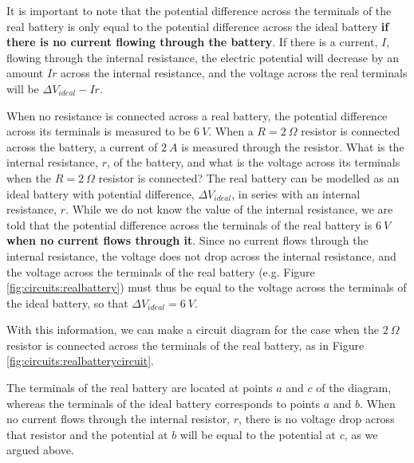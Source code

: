 It is important to note that the potential difference across the terminals of the real battery is only equal to the potential difference across the ideal battery \textbf{if there is no current flowing through the battery}. If there is a current, $I$, flowing through the internal resistance, the electric potential will decrease by an amount $Ir$ across the internal resistance, and the voltage across the real terminals will be $\Delta V_{ideal}-Ir$. 
\vspace{-0.25cm}
\begin{example}{When no resistance is connected across a real battery, the potential difference across its terminals is measured to be $\SI{6}{V}$. When a $R=\SI{2}{\Omega}$ resistor is connected across the battery, a current of $\SI{2}{A}$ is measured through the resistor. What is the internal resistance, $r$, of the battery, and what is the voltage across its terminals when the $R=\SI{2}{\Omega}$ resistor is connected?}
The real battery can be modelled as an ideal battery with potential difference, $\Delta V_{ideal}$, in series with an internal resistance, $r$. While we do not know the value of the internal resistance, we are told that the potential difference across the terminals of the real battery is $\SI{6}{V}$ \textbf{when no current flows through it}. Since no current flows through the internal resistance, the voltage does not drop across the internal resistance, and the voltage across the terminals of the real battery (e.g. Figure \ref{fig:circuits:realbattery}) must thus be equal to the voltage across the terminals of the ideal battery, so that $\Delta V_{ideal}=\SI{6}{V}$.

With this information, we can make a circuit diagram for the case when the $\SI{2}{\Omega}$ resistor is connected across the terminals of the real battery, as in Figure \ref{fig:circuits:realbatterycircuit}.


The terminals of the real battery are located at points $a$ and $c$ of the diagram, whereas the terminals of the ideal battery corresponds to points $a$ and $b$. When no current flows through the internal resistor, $r$, there is no voltage drop across that resistor and the potential at $b$ will be equal to the potential at $c$, as we argued above.


\end{example}
